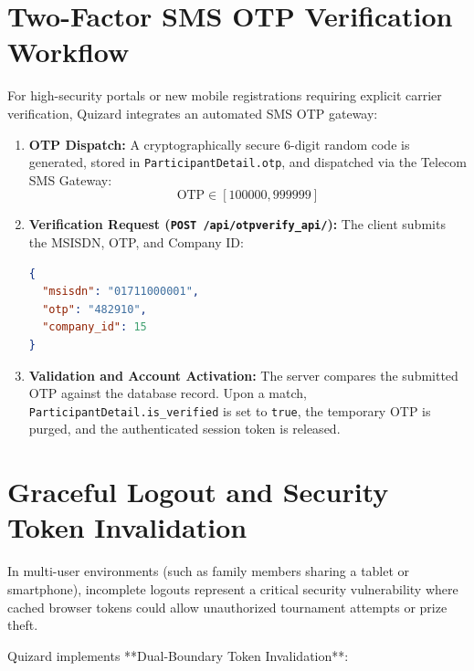 \section{Two-Factor SMS OTP Verification Workflow}
For high-security portals or new mobile registrations requiring explicit carrier verification, Quizard integrates an automated SMS OTP gateway:

\begin{enumerate}
    \item \textbf{OTP Dispatch:} A cryptographically secure 6-digit random code is generated, stored in \texttt{ParticipantDetail.otp}, and dispatched via the Telecom SMS Gateway:
    $$\text{OTP} \in [100000, 999999]$$
    \item \textbf{Verification Request (\texttt{POST /api/otpverify\_api/}):} The client submits the MSISDN, OTP, and Company ID:
\begin{lstlisting}[language=json, caption={OTP Verification Request}]
{
  "msisdn": "01711000001",
  "otp": "482910",
  "company_id": 15
}
\end{lstlisting}
    \item \textbf{Validation and Account Activation:} The server compares the submitted OTP against the database record. Upon a match, \texttt{ParticipantDetail.is\_verified} is set to \texttt{true}, the temporary OTP is purged, and the authenticated session token is released.
\end{enumerate}

\section{Graceful Logout and Security Token Invalidation}
In multi-user environments (such as family members sharing a tablet or smartphone), incomplete logouts represent a critical security vulnerability where cached browser tokens could allow unauthorized tournament attempts or prize theft.

Quizard implements **Dual-Boundary Token Invalidation**:

